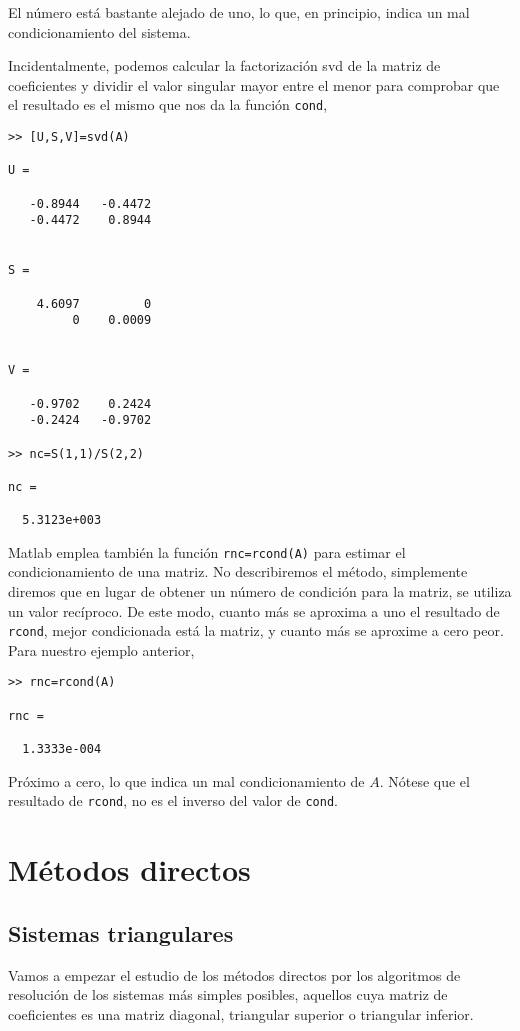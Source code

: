 El número está bastante alejado de uno, lo que, en principio, indica un mal condicionamiento del sistema. 

Incidentalmente, podemos calcular la factorización svd de la matriz de coeficientes y dividir el valor singular mayor entre el menor para comprobar que el resultado es el mismo que nos da la función \texttt{cond},
\begin{verbatim}
>> [U,S,V]=svd(A)

U =

   -0.8944   -0.4472
   -0.4472    0.8944


S =

    4.6097         0
         0    0.0009


V =

   -0.9702    0.2424
   -0.2424   -0.9702

>> nc=S(1,1)/S(2,2)

nc =

  5.3123e+003
\end{verbatim}

Matlab emplea también la función \texttt{rnc=rcond(A)} para estimar el condicionamiento de una matriz. No describiremos el método, simplemente diremos que en lugar de obtener un número de condición para la matriz, se utiliza un valor recíproco. De este modo, cuanto más se aproxima a uno el resultado de \texttt{rcond}, mejor condicionada está la matriz, y cuanto más se aproxime a cero peor. Para nuestro ejemplo anterior,

\begin{verbatim}
>> rnc=rcond(A)

rnc =

  1.3333e-004

\end{verbatim}

Próximo a cero, lo que indica un mal condicionamiento de $A$. Nótese que el resultado de \texttt{rcond}, no es el inverso del valor de \texttt{cond}.

\section{Métodos directos}
\subsection{Sistemas triangulares}
Vamos a empezar el estudio de los métodos directos por los algoritmos de resolución de los sistemas más simples posibles, aquellos cuya matriz de coeficientes es una matriz diagonal, triangular superior o triangular inferior.
